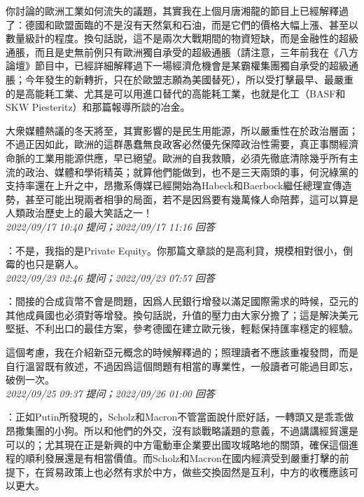 \documentclass[twocolumn]{ctexart}
\begin{document}
你討論的歐洲工業如何流失的議題，其實我在上個月唐湘龍的節目上已經解釋過了：德國和歐盟面臨的不是沒有天然氣和石油，而是它們的價格大幅上漲、甚至以數量級計的程度。換句話説，這不是兩次大戰期間的物資短缺，而是金融性的超級通脹，而且是史無前例只有歐洲獨自承受的超級通脹（請注意，三年前我在《八方論壇》節目中，已經詳細解釋過下一場經濟危機會是某霸權集團獨自承受的超級通脹；今年發生的新轉折，只在於歐盟志願為美國替死），所以受打擊最早、最嚴重的是高能耗工業、尤其是可以用進口替代的高能耗工業，也就是化工（BASF和SKW Piesteritz）和那篇報導所談的冶金。

大衆媒體熱議的冬天將至，其實影響的是民生用能源，所以嚴重性在於政治層面；不過正因如此，歐洲的這群愚蠢無良政客必然優先保障政治性需要，真正事關經濟命脈的工業用能源供應，早已絕望。歐洲的自我救贖，必須先徹底清除幾乎所有主流的政治、媒體和學術精英；就算他們能做到，也不是三天兩頭的事，何況綠黨的支持率還在上升之中，昂撒系傳媒已經開始為Habeck和Baerbock繼任總理宣傳造勢，甚至可能出現兩者相爭的局面，若不是因爲要有幾萬條人命陪葬，這可以算是人類政治歷史上的最大笑話之一！
\\

\textit{\hfill\noindent\small 2022/09/17 10:40 提问；2022/09/17 11:16 回答}

：不是，我指的是Private Equity。你那篇文章談的是高利貸，規模相對很小，倒霉的也只是窮人。
\\

\textit{\hfill\noindent\small 2022/09/23 02:46 提问；2022/09/23 07:57 回答}

：間接的合成貨幣不會是問題，因爲人民銀行增發以滿足國際需求的時候，亞元的其他成員國也必須對等增發。換句話説，升值的壓力由大家分擔了；這是解決美元堅挺、不利出口的最佳方案，參考德國在建立歐元後，輕鬆保持匯率穩定的經驗。

這個考慮，我在介紹新亞元概念的時候解釋過的；照理讀者不應該重複發問，而是自行溫習既有敘述，不過因爲這個問題有相當的專業性，一般讀者可能過目即忘，破例一次。
\\

\textit{\hfill\noindent\small 2022/09/25 09:37 提问；2022/09/26 01:00 回答}

：正如Putin所發現的，Scholz和Macron不管當面說什麽好話，一轉頭又是乖乖做昂撒集團的小狗。所以和他們的外交，沒有談戰略議題的意義，不過講講經貿還是可以的；尤其現在正是新興的中方電動車企業要出國攻城略地的關頭，確保這個進程的順利發展還是有相當價值。而Scholz和Macron在國内經濟受到嚴重打擊的前提下，在貿易政策上也必然有求於中方，做些交換固然是互利，中方的收穫應該可以更大。
\end{document}
